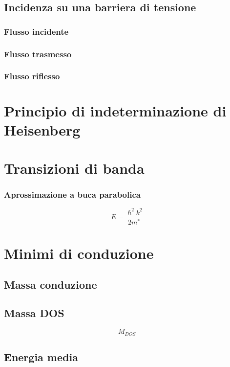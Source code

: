 \documentclass[10pt,a4paper]{report}
\begin{document}
	\section{Incidenza su una barriera di tensione}

		\subsection{Flusso incidente}

		\subsection{Flusso trasmesso}

		\subsection{Flusso riflesso}


\chapter{Principio di indeterminazione di Heisenberg}

\chapter{Transizioni di banda}

 	\subsection{Aprossimazione a buca parabolica}

 	\[
 	E=\frac{\hslash^2 k^2}{2 m^*}
 	\]

\chapter{Minimi di conduzione}

	\section{Massa conduzione}

	\section{Massa DOS}
	\begin{equation}
	M_{DOS}
	\end{equation}

	
	\section{Energia media}
\end{document}
